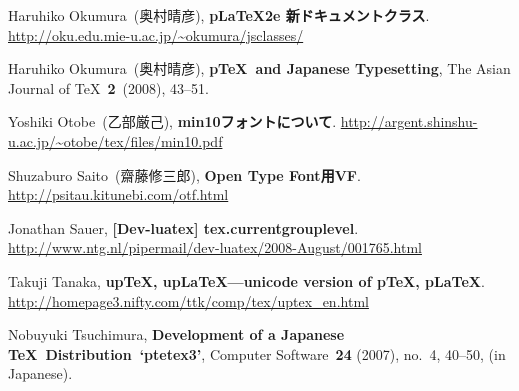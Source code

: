 \documentclass{ajt}
\begin{document}
\begin{thebibliography}{99}
Haruhiko Okumura\ (奥村晴彦), \textbf{pLaTeX2e 新ドキュメントクラス}.
\url{http://oku.edu.mie-u.ac.jp/~okumura/jsclasses/}

Haruhiko Okumura\ (奥村晴彦), \textbf{p\TeX\ and Japanese Typesetting},
	The Asian Journal of \TeX\ \textbf{2}~(2008), 43--51.

Yoshiki Otobe\ (乙部厳己), \textbf{min10フォントについて}.
\url{http://argent.shinshu-u.ac.jp/~otobe/tex/files/min10.pdf}

Shuzaburo Saito\ (齋藤修三郎), \textbf{Open Type Font用VF}.
\url{http://psitau.kitunebi.com/otf.html}

Jonathan Sauer, \textbf{[Dev-luatex] tex.currentgrouplevel}. 
\url{http://www.ntg.nl/pipermail/dev-luatex/2008-August/001765.html}

Takuji Tanaka, \textbf{up\TeX, up\LaTeX---unicode version of p\TeX, p\LaTeX}.
\url{http://homepage3.nifty.com/ttk/comp/tex/uptex_en.html}

Nobuyuki Tsuchimura, \textbf{Development of a Japanese \TeX\ Distribution~`ptetex3'},
Computer Software\ \textbf{24} (2007), no.~4, 40--50, (in Japanese).

\end{thebibliography}
\end{document}
